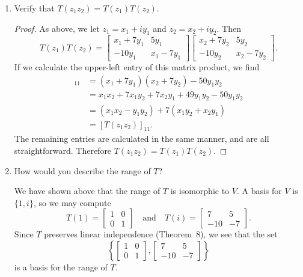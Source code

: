 \begin{enumerate}
\item Verify that $T(z_1z_2) = T(z_1)T(z_2)$.
  \begin{proof}
    As above, we let $z_1 = x_1 + iy_1$ and $z_2 = x_2 + iy_2$. Then
    \begin{equation*}
      T(z_1)T(z_2)
      =
      \begin{bmatrix}
        x_1 + 7y_1 & 5y_1 \\
        -10y_1 & x_1 - 7y_1
      \end{bmatrix}
      \begin{bmatrix}
        x_2 + 7y_2 & 5y_2 \\
        -10y_2 & x_2 - 7y_2
      \end{bmatrix}.
    \end{equation*}
    If we calculate the upper-left entry of this matrix product, we
    find
    \begin{align*}
      [T(z_1)T(z_2)]_{11}
      &= (x_1 + 7y_1)(x_2 + 7y_2) - 50y_1y_2 \\
      &= x_1x_2 + 7x_1y_2 + 7x_2y_1 + 49y_1y_2 - 50y_1y_2 \\
      &= (x_1x_2 - y_1y_2) + 7(x_1y_2 + x_2y_1) \\
      &= [T(z_1z_2)]_{11}.
    \end{align*}
    The remaining entries are calculated in the same manner, and are
    all straightforward. Therefore $T(z_1z_2) = T(z_1)T(z_2)$.
  \end{proof}

\item How would you describe the range of $T$?
  \begin{solution}
    We have shown above that the range of $T$ is isomorphic to $V$. A
    basis for $V$ is $\{1, i\}$, so we may compute
    \begin{equation*}
      T(1) =
      \begin{bmatrix}
        1 & 0 \\
        0 & 1
      \end{bmatrix}
      \quad\text{and}\quad
      T(i) =
      \begin{bmatrix}
        7 & 5 \\
        -10 & -7
      \end{bmatrix}.
    \end{equation*}
    Since $T$ preserves linear independence (Theorem~8), we see that
    the set
    \begin{equation*}
      \left\{
        \begin{bmatrix}
          1 & 0 \\
          0 & 1
        \end{bmatrix},
        \begin{bmatrix}
          7 & 5 \\
          -10 & -7
        \end{bmatrix}
      \right\}
    \end{equation*}
    is a basis for the range of $T$.
  \end{solution}
\end{enumerate}

